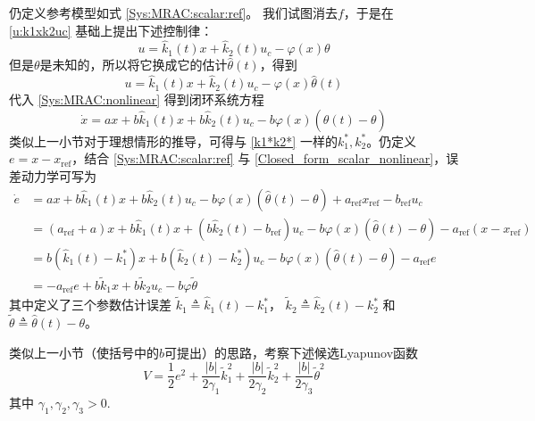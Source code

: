 仍定义参考模型如式 \eqref{Sys:MRAC:scalar:ref}。
我们试图消去$f$，于是在  \eqref{u:k1xk2uc} 基础上提出下述控制律：
\begin{equation*}
  u = \hat{k}_1 (t) x + \hat{k}_2 (t) u_c - \varphi (x) \theta
\end{equation*}
但是$\theta$是未知的，所以将它换成它的估计$\hat{\theta} (t)$，得到
\begin{equation}
  u = \hat{k}_1 (t) x + \hat{k}_2 (t) u_c - \varphi (x) \hat{\theta} (t)
\end{equation}
代入 \eqref{Sys:MRAC:nonlinear} 得到闭环系统方程
\begin{equation}
    \dot{x} = a  x +  b \hat{k}_1 (t) x + b \hat{k}_2 (t) u_c - b \varphi
   (x) (\hat{\theta} (t) - \theta) \label{Closed_form_scalar_nonlinear}
\end{equation}
类似上一小节对于理想情形的推导，可得与 \eqref{k1*k2*} 一样的$k^{\ast}_1, k^{\ast}_2$。仍定义$e=x-x_{\operatorname{ref}}$，结合 \eqref{Sys:MRAC:scalar:ref} 与 \eqref{Closed_form_scalar_nonlinear}，误差动力学可写为
\begin{align}
  \dot{e} & =  a  x +  b \hat{k}_1 (t) x + b \hat{k}_2 (t) u_c - b \varphi
  (x) (\hat{\theta} (t) - \theta) + a_{\ensuremath{\operatorname{ref}}}
  x_{\ensuremath{\operatorname{ref}}} - b_{\ensuremath{\operatorname{ref}}}
  u_c \nonumber\\
  & = (a_{\ensuremath{\operatorname{ref}}} + a) x +  b \hat{k}_1 (t) x +
  (b \hat{k}_2 (t) - b_{\ensuremath{\operatorname{ref}}}) u_c - b \varphi (x)
  (\hat{\theta} (t) - \theta) - a_{\ensuremath{\operatorname{ref}}} (x-x_{\operatorname{ref}})
  \nonumber\\
  & =  b (\hat{k}_1 (t) - k^{\ast}_1) x + b (\hat{k}_2 (t) - k^{\ast}_2)
  u_c - b \varphi (x) (\hat{\theta} (t) - \theta) -
  a_{\ensuremath{\operatorname{ref}}} e \nonumber\\
  & =  - a_{\ensuremath{\operatorname{ref}}} e + b \tilde{k}_1 x + b
  \tilde{k}_2 u_c - b \varphi \tilde{\theta}  \label{err:MRAC:nonlinear}
\end{align}
其中定义了三个参数估计误差 $\tilde{k}_1 \triangleq \hat{k}_1 (t) - k^{\ast}_1$， $\tilde{k}_2 \triangleq \hat{k}_2
(t) - k^{\ast}_2$ 和 $\tilde{\theta} \triangleq\hat{\theta} (t) - \theta$。

类似上一小节（使括号中的$b$可提出）的思路，考察下述候选Lyapunov函数
\begin{equation}
  V = \frac{1}{2} e^2 + \frac{| b |}{2 \gamma_1} \tilde{k}^2_1 + \frac{| b
  |}{2 \gamma_2} \tilde{k}^2_2 + \frac{| b |}{2 \gamma_3} \tilde{\theta}^2 
  \label{Lyafun:ek1k2j}
\end{equation}
其中 $\gamma_1, \gamma_2, \gamma_3 > 0$.

